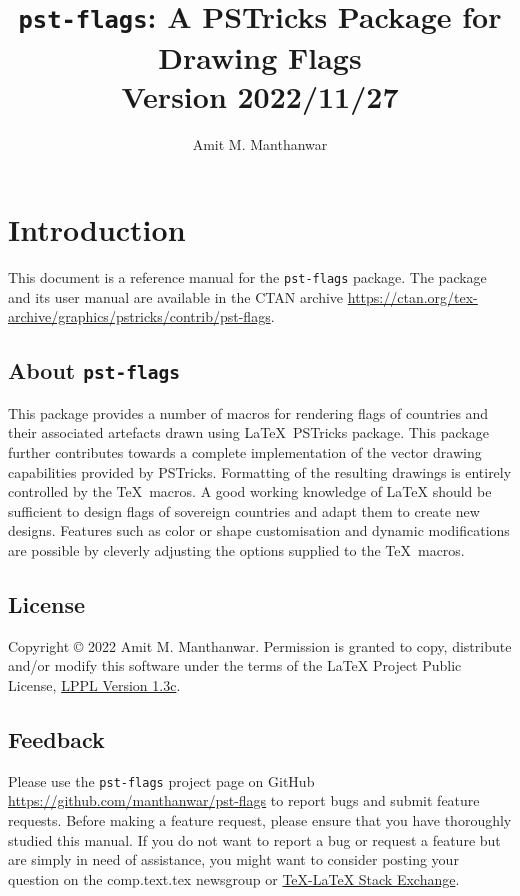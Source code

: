 \documentclass{amm-pst-doc}
\title{\vspace*{-10mm}
\texttt{pst-flags}: A PSTricks Package for Drawing Flags\\[2mm]
\Large{Version 2022/11/27}}
\author{Amit M. Manthanwar}
\date{}
\begin{document}
\maketitle

\section{Introduction}
This document is a reference manual for the \texttt{pst-flags} package. The package and its user manual are available in the CTAN archive \href{https://ctan.org/tex-archive/graphics/pstricks/contrib/pst-flags} {https://ctan.org/tex-archive/graphics/pstricks/contrib/pst-flags}.

\subsection{About \texttt{pst-flags}}
This package provides a number of macros for rendering flags of countries and their associated artefacts drawn using \LaTeX\ PSTricks package. This package further contributes towards a complete implementation of the vector drawing capabilities provided by PSTricks. Formatting of the resulting drawings is entirely controlled by the \TeX\ macros. A good working knowledge of LaTeX should be sufficient to design flags of sovereign countries and adapt them to create new designs. Features such as color or shape customisation and dynamic modifications are possible by cleverly adjusting the options supplied to the \TeX\ macros.

\subsection{License}
Copyright © 2022 Amit M. Manthanwar. Permission is granted to
copy, distribute and/or modify this software under the terms of the LaTeX Project Public License, \href{https://www.latex-project.org/lppl.txt}{LPPL Version 1.3c}.

\subsection{Feedback}
Please use the \texttt{pst-flags} project page on GitHub \href{https://github.com/manthanwar/pst-flags}{https://github.com/manthanwar/pst-flags} to report bugs and submit feature requests. Before making a feature request, please ensure that you have thoroughly studied this manual. If you do not want to report a bug or request a feature but are simply in need of assistance, you might want to consider posting your question on the comp.text.tex newsgroup or  \href{https://tex.stackexchange.com/questions/tagged/pst-flags} {TeX-LaTeX Stack Exchange}.
\end{document}
